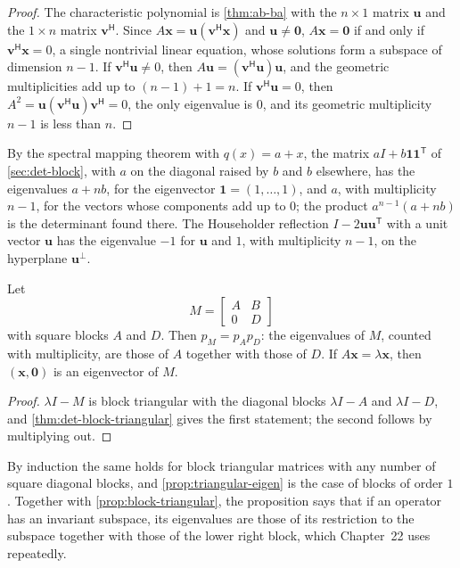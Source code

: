 \begin{proof}
The characteristic polynomial is \cref{thm:ab-ba} with the $n\times1$ matrix $\mathbf u$ and the $1\times n$ matrix $\mathbf v^{\mathsf H}$. Since $A\mathbf x=\mathbf u(\mathbf v^{\mathsf H}\mathbf x)$ and $\mathbf u\ne\mathbf 0$, $A\mathbf x=\mathbf 0$ if and only if $\mathbf v^{\mathsf H}\mathbf x=0$, a single nontrivial linear equation, whose solutions form a subspace of dimension $n-1$. If $\mathbf v^{\mathsf H}\mathbf u\ne0$, then $A\mathbf u=(\mathbf v^{\mathsf H}\mathbf u)\mathbf u$, and the geometric multiplicities add up to $(n-1)+1=n$. If $\mathbf v^{\mathsf H}\mathbf u=0$, then $A^2=\mathbf u(\mathbf v^{\mathsf H}\mathbf u)\mathbf v^{\mathsf H}=0$, the only eigenvalue is $0$, and its geometric multiplicity $n-1$ is less than $n$.
\end{proof}

By the spectral mapping theorem with $q(x)=a+x$, the matrix $aI+b\mathbf 1\mathbf 1^{\mathsf T}$ of \cref{sec:det-block}, with $a$ on the diagonal raised by $b$ and $b$ elsewhere, has the eigenvalues $a+nb$, for the eigenvector $\mathbf 1=(1,\ldots,1)$, and $a$, with multiplicity $n-1$, for the vectors whose components add up to $0$; the product $a^{n-1}(a+nb)$ is the determinant found there. The Householder reflection $I-2\mathbf u\mathbf u^{\mathsf T}$ with a unit vector $\mathbf u$ has the eigenvalue $-1$ for $\mathbf u$ and $1$, with multiplicity $n-1$, on the hyperplane $\mathbf u^\perp$.

\begin{proposition}
\label{prop:block-triangular-eigen}
Let
\[
M=\begin{bmatrix}A&B\\0&D\end{bmatrix}
\]
with square blocks $A$ and $D$. Then $p_M=p_Ap_D$: the eigenvalues of $M$, counted with multiplicity, are those of $A$ together with those of $D$. If $A\mathbf x=\lambda\mathbf x$, then $(\mathbf x,\mathbf 0)$ is an eigenvector of $M$.
\end{proposition}

\begin{proof}
$\lambda I-M$ is block triangular with the diagonal blocks $\lambda I-A$ and $\lambda I-D$, and \cref{thm:det-block-triangular} gives the first statement; the second follows by multiplying out.
\end{proof}

By induction the same holds for block triangular matrices with any number of square diagonal blocks, and \cref{prop:triangular-eigen} is the case of blocks of order $1$. Together with \cref{prop:block-triangular}, the proposition says that if an operator has an invariant subspace, its eigenvalues are those of its restriction to the subspace together with those of the lower right block, which Chapter~22 uses repeatedly.

